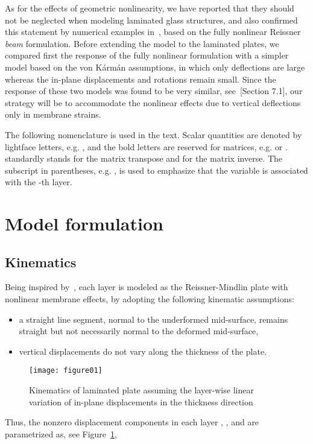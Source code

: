 \documentclass[11pt]{article}
\begin{document}
As for the effects of geometric nonlinearity, we have reported that they should not be neglected when modeling laminated glass structures, and also confirmed this statement by numerical examples in~\cite{Zemanova:2014:NMFS}, based on the fully nonlinear Reissner \emph{beam} formulation. Before extending the model to the laminated plates, we compared first the response of the fully nonlinear formulation with a simpler model based on the von K\'{a}rm\'{a}n assumptions, in which only deflections are large whereas the in-plane displacements and rotations remain small. Since the response of these two models was found to be very similar, see~\cite{Zemanova:2014:NMLG}[Section 7.1], our strategy will be to accommodate the nonlinear effects due to vertical deflections only in membrane strains. 


The following nomenclature is used in the text. Scalar quantities are denoted by lightface letters, e.g. , and the bold letters are reserved for matrices, e.g.  or .  standardly stands for the matrix transpose and  for the matrix inverse. The subscript in parentheses, e.g. , is used to emphasize that the variable  is associated with the -th layer.

\section{Model formulation}\label{sec:formulation}


\subsection{Kinematics}\label{sec:kinematics}
Being inspired by~\cite{Pica:1980:FEA}, each layer is modeled as the Reissner-Mindlin plate with nonlinear membrane effects, by adopting
the following kinematic assumptions:
\begin{itemize}
\item a straight line segment, normal to the underformed mid-surface, remains
straight but not necessarily normal to the deformed mid-surface,
\item vertical displacements do not vary along the thickness of the plate.
\end{itemize}
\begin{figure}[ht]
\centerline{\texttt{[image: figure01]} 
}\caption{Kinematics of laminated plate assuming the layer-wise linear variation of in-plane displacements in the thickness direction}
\label{fig:lam_plate}
\end{figure}
Thus, the nonzero displacement components in each layer , , and 
are parametrized as, see Figure~\ref{fig:lam_plate},
\end{document}
